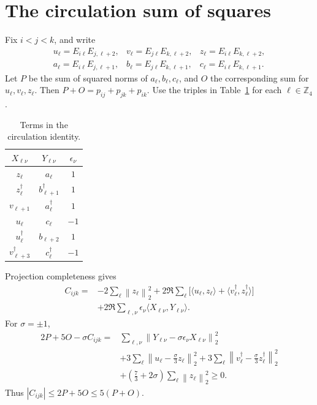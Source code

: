 \documentclass[11pt]{amsart}
\theoremstyle{remark}
\theoremstyle{plain}
\numberwithin{equation}{section}
\newcommand{\Z}{\mathbb Z}
\newcommand{\norm}[1]{\left\|#1\right\|}
\newcommand{\ip}[2]{\langle#1,#2\rangle}
\begin{document}
\section{The circulation sum of squares}\label{app:circulation}

Fix \(i<j<k\), and write
\[
 \begin{array}{lll}
 u_\ell=E_{i\ell}E_{j,\ell+2},&
 v_\ell=E_{j\ell}E_{k,\ell+2},&
 z_\ell=E_{i\ell}E_{k,\ell+2},\\
 a_\ell=E_{i\ell}E_{j,\ell+1},&
 b_\ell=E_{j\ell}E_{k,\ell+1},&
 c_\ell=E_{i\ell}E_{k,\ell+1}.
 \end{array}
\]
Let \(P\) be the sum of squared norms of \(a_\ell,b_\ell,c_\ell\),
and \(O\) the corresponding sum for \(u_\ell,v_\ell,z_\ell\).
Then \(P+O=p_{ij}+p_{jk}+p_{ik}\).
Use the triples in Table~\ref{tab:circulation} for each
\(\ell\in\Z_4\).

\begin{table}[ht]
\centering
\caption{Terms in the circulation identity.}
\label{tab:circulation}
\begin{tabular}{@{}ccc@{}}
\toprule
\(X_{\ell\nu}\) & \(Y_{\ell\nu}\) & \(\epsilon_\nu\)\\
\midrule
\(z_\ell\) & \(a_\ell\) & \(1\)\\
\(z_\ell^\dagger\) & \(b_{\ell+1}^\dagger\) & \(1\)\\
\(v_{\ell+1}\) & \(a_\ell^\dagger\) & \(1\)\\
\(u_\ell\) & \(c_\ell\) & \(-1\)\\
\(u_\ell^\dagger\) & \(b_{\ell+2}\) & \(1\)\\
\(v_{\ell+3}^\dagger\) & \(c_\ell^\dagger\) & \(-1\)\\
\bottomrule
\end{tabular}
\end{table}

Projection completeness gives
\[
 \begin{split}
 C_{ijk}={}&-2\sum_\ell\norm{z_\ell}_2^2
 +2\Re\sum_\ell
       \bigl[\ip{u_\ell}{z_\ell}
          +\ip{v_\ell^\dagger}{z_\ell^\dagger}\bigr]\\
 &+2\Re\sum_{\ell,\nu}
       \epsilon_\nu\ip{X_{\ell\nu}}{Y_{\ell\nu}}.
 \end{split}
\]
For \(\sigma=\pm1\),
\begin{equation}\label{eq:circulationSOS}
 \begin{split}
 2P+5O-\sigma C_{ijk}
 ={}&\sum_{\ell,\nu}
       \norm{Y_{\ell\nu}-\sigma\epsilon_\nu X_{\ell\nu}}_2^2\\
 &+3\sum_\ell\norm{u_\ell-\tfrac\sigma3z_\ell}_2^2
 +3\sum_\ell
       \norm{v_\ell^\dagger-\tfrac\sigma3z_\ell^\dagger}_2^2\\
 &+\left(\frac73+2\sigma\right)
       \sum_\ell\norm{z_\ell}_2^2\ge0.
 \end{split}
\end{equation}
Thus \(|C_{ijk}|\le2P+5O\le5(P+O)\).
\end{document}
